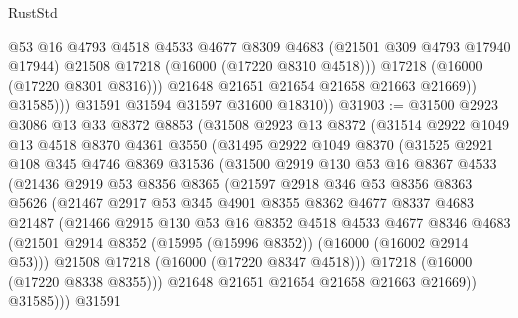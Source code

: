 \begin{lexlean}{RustStd}
\begin{coremodule}
                      @53
                      @16
                      @4793
                      @4518
                      @4533
                      @4677
                      @8309
                      @4683
                      (@21501 @309 @4793 @17940 @17944)
                      @21508
                      @17218
                      (@16000 (@17220 @8310 @4518)))
                    @17218
                    (@16000 (@17220 @8301 @8316)))
                  @21648
                  @21651
                  @21654
                  @21658
                  @21663
                  @21669))
              @31585)))
        @31591
        @31594
        @31597
        @31600
        @18310))
@31903 := @31500
    @2923
    @3086
    @13
    @33
    @8372
    @8853
    (@31508
      @2923
      @13
      @8372
      (@31514
        @2922
        @1049
        @13
        @4518
        @8370
        @4361
        @3550
        (@31495
          @2922
          @1049
          @8370
          (@31525
            @2921
            @108
            @345
            @4746
            @8369
            @31536
            (@31500
              @2919
              @130
              @53
              @16
              @8367
              @4533
              (@21436
                @2919
                @53
                @8356
                @8365
                (@21597
                  @2918
                  @346
                  @53
                  @8356
                  @8363
                  @5626
                  (@21467
                    @2917
                    @53
                    @345
                    @4901
                    @8355
                    @8362
                    @4677
                    @8337
                    @4683
                    @21487
                    (@21466
                      @2915
                      @130
                      @53
                      @16
                      @8352
                      @4518
                      @4533
                      @4677
                      @8346
                      @4683
                      (@21501 @2914 @8352 (@15995 (@15996 @8352)) (@16000 (@16002 @2914 @53)))
                      @21508
                      @17218
                      (@16000 (@17220 @8347 @4518)))
                    @17218
                    (@16000 (@17220 @8338 @8355)))
                  @21648
                  @21651
                  @21654
                  @21658
                  @21663
                  @21669))
              @31585)))
        @31591

\end{coremodule}
\end{lexlean}
